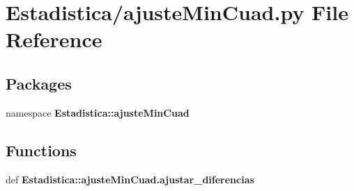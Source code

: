 \section{\-Estadistica/ajuste\-Min\-Cuad.py \-File \-Reference}
\label{ajuste_min_cuad_8py}
\subsection*{\-Packages}
\begin{DoxyCompactItemize}
\item 
namespace {\bf \-Estadistica\-::ajuste\-Min\-Cuad}
\end{DoxyCompactItemize}
\subsection*{\-Functions}
\begin{DoxyCompactItemize}
\item 
def {\bf \-Estadistica\-::ajuste\-Min\-Cuad.\-ajustar\-\_\-diferencias}
\end{DoxyCompactItemize}

